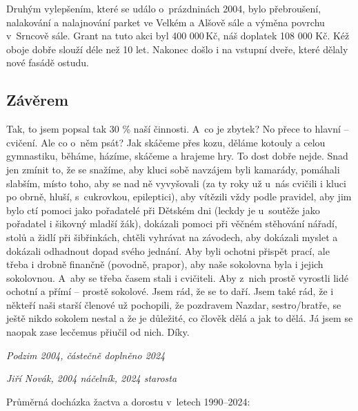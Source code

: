 \documentclass[a5paper, 11pt, twoside]{article}
\begin{document}
Druhým vylepšením, které se událo o~prázdninách 2004, bylo přebroušení,
nalakování a nalajnování parket ve Velkém a Alšově sále a výměna povrchu
v~Srncově sále. Grant na tuto akci byl 400 000\,Kč, náš doplatek 108 000
Kč. Kéž oboje dobře slouží déle než 10 let. Nakonec došlo i na vstupní
dveře, které dělaly nové fasádě ostudu.

\subsection{Závěrem}

Tak, to jsem popsal tak 30 \% naší činnosti. A~co je zbytek? No přece to
hlavní -- cvičení. Ale co o~něm psát? Jak skáčeme přes kozu, děláme
kotouly a celou gymnastiku, běháme, házíme, skáčeme a hrajeme hry. To
dost dobře nejde. Snad jen zmínit to, že se snažíme, aby kluci sobě
navzájem byli kamarády, pomáhali slabším, místo toho, aby se nad ně
vyvyšovali (za ty roky už u~nás cvičili i kluci po obrně, hluší,
s~cukrovkou, epileptici), aby vítězili vždy podle pravidel, aby jim bylo
ctí pomoci jako pořadatelé při Dětském dni (leckdy je u~soutěže jako
pořadatel i šikovný mladší žák), dokázali pomoci při věčném stěhování
nářadí, stolů a židlí při šibřinkách, chtěli vyhrávat na závodech, aby
dokázali myslet a dokázali odhadnout dopad svého jednání. Aby byli
ochotni přispět prací, ale třeba i drobně finančně (povodně, prapor),
aby naše sokolovna byla i jejich sokolovnou. A~aby se třeba časem stali
i cvičiteli. Aby z~nich prostě vyrostli lidé ochotní a přímí -- prostě
sokolové. Jsem rád, že se to daří. Jsem také rád, že i někteří naši
starší členové už pochopili, že pozdravem Nazdar, sestro/bratře, se
ještě nikdo sokolem nestal a že je důležité, co člověk dělá a jak to
dělá. Já jsem se naopak zase lecčemus přiučil od nich. Díky.

\vspace{\baselineskip}
\hfill\textit{Podzim 2004, částečně doplněno 2024}

\hfill\textit{Jiří Novák, 2004 náčelník, 2024 starosta}

Průměrná docházka žactva a dorostu v~letech 1990--2024:
\end{document}
